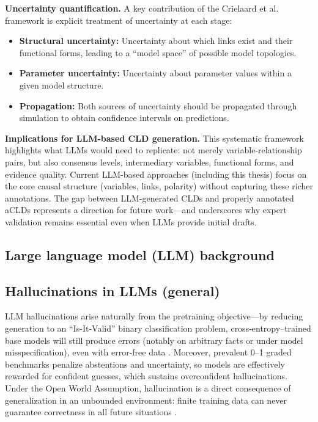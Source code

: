 \medskip
\noindent
\textbf{Uncertainty quantification.} A key contribution of the Crielaard et al. framework is explicit treatment of uncertainty at each stage:
\begin{itemize}
    \item \textbf{Structural uncertainty:} Uncertainty about which links exist and their functional forms, leading to a ``model space'' of possible model topologies.
    \item \textbf{Parameter uncertainty:} Uncertainty about parameter values within a given model structure.
    \item \textbf{Propagation:} Both sources of uncertainty should be propagated through simulation to obtain confidence intervals on predictions.
\end{itemize}

\medskip
\noindent
\textbf{Implications for LLM-based CLD generation.} This systematic framework highlights what LLMs would need to replicate: not merely variable-relationship pairs, but also consensus levels, intermediary variables, functional forms, and evidence quality. Current LLM-based approaches (including this thesis) focus on the core causal structure (variables, links, polarity) without capturing these richer annotations. The gap between LLM-generated CLDs and properly annotated aCLDs represents a direction for future work---and underscores why expert validation remains essential even when LLMs provide initial drafts.

\subsection{Large language model (LLM) background}
\label{sec:background_llms}



\subsection{Hallucinations in LLMs (general)}
\label{sec:background_hallucinations_general}

LLM hallucinations arise naturally from the pretraining objective---by reducing generation to an ``Is-It-Valid'' binary classification problem, cross-entropy--trained base models will still produce errors (notably on arbitrary facts or under model misspecification), even with error-free data \citep{kalai2025languagemodelshallucinate}. Moreover, prevalent 0--1 graded benchmarks penalize abstentions and uncertainty, so models are effectively rewarded for confident guesses, which sustains overconfident hallucinations. Under the Open World Assumption, hallucination is a direct consequence of generalization in an unbounded environment: finite training data can never guarantee correctness in all future situations \citep{xu2025hallucination}.

